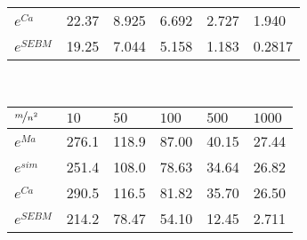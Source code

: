 \begin{table*}[]
\begin{minipage}[]{0.8\textwidth}
\begin{tabular}{llllll}
			$e^{Ca}$    & 22.37 & 8.925 & 6.692 & 2.727 & 1.940 \\
			$e^{SEBM}$  & 19.25 & 7.044 & 5.158 & 1.183 & 0.2817  \\
			\hline
			\end{tabular}
    \end{minipage}
	\\\vspace{4mm}
    \begin{minipage}[]{0.8\textwidth}
        \centering
        \caption{Complex Reward Division Game average errors}\label{tab4}
			\centering
			\begin{tabular}{llllll}
			\hline
			$\nicefrac{m}{n^2}$ & $10$ & $50$ & $100$ & $500$ & $1000$ \\
			\hline
			$e^{Ma}$   & 276.1 & 118.9 & 87.00 & 40.15 & 27.44 \\
			$e^{sim}$  & 251.4 & 108.0 & 78.63 & 34.64 & 26.82 \\
			$e^{Ca}$   & 290.5 & 116.5 & 81.82 & 35.70 & 26.50 \\
			$e^{SEBM}$ & 214.2 & 78.47 & 54.10 & 12.45 & 2.711  \\
			\hline
			\end{tabular}
    \end{minipage}
    \vspace{3mm}
    \caption[Average errors approximating the Shapley Value across games and methods]{Average absolute errors in the Shapley value calculation across all players in the four cooperative games (units in $10^{-4}$), for the different sampling schemes with different sampling budgets $m$ per number of strata (with $n^2=15^2$ for all).}
    \label{Table2}
\end{table*}
